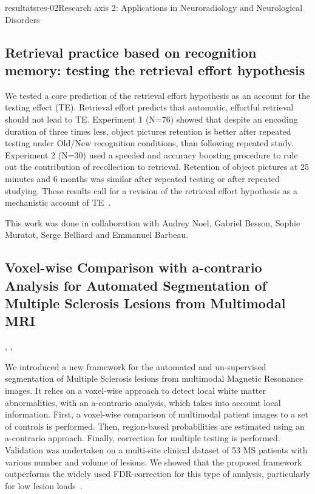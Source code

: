 \documentclass{ra2018}
\begin{document}
\begin{module}{resultats}{res-02}{Research axis 2: Applications in Neuroradiology and Neurological Disorders}
\subsection{Retrieval practice based on recognition memory: testing the retrieval effort hypothesis}
\begin{participants}
\end{participants}
We tested a core prediction of the retrieval effort hypothesis as an account for the testing effect (TE). Retrieval effort predicts that automatic, effortful retrieval should not lead to TE. Experiment 1 (N=76) showed that despite an encoding duration of three times less, object pictures retention is better after repeated testing under Old/New recognition conditions, than following repeated study. Experiment 2 (N=30) used a speeded and accuracy boosting procedure to rule out the contribution of recollection to retrieval. Retention of object pictures at 25 minutes and 6 months was similar after repeated testing or after repeated studying. These results call for a revision of the retrieval effort hypothesis as a mechanistic account of TE~\cite{jonin:inserm-01939069}.

This work was done in collaboration with Audrey Noel, Gabriel Besson, Sophie Muratot, Serge Belliard and Emmanuel Barbeau.


\subsection{Voxel-wise Comparison with a-contrario Analysis for Automated Segmentation of Multiple Sclerosis Lesions from Multimodal MRI}
\begin{participants}
      ,
      ,
\end{participants}
We introduced a new framework for the automated and un-supervised segmentation of Multiple Sclerosis lesions from multimodal Magnetic Resonance images. It relies on a voxel-wise approach to detect local white matter abnormalities, with an a-contrario analysis, which takes into account local information. First, a voxel-wise comparison of multimodal patient images to a set of controls is performed. Then, region-based probabilities are estimated using an a-contrario approach. Finally, correction for multiple testing is performed. Validation was undertaken on a multi-site clinical dataset of 53 MS patients with various number and volume of lesions. We showed that the proposed framework outperforms the widely used FDR-correction for this type of analysis, particularly for low lesion loads~\cite{galassi:inserm-01888928}.


\end{module}
\end{document}
